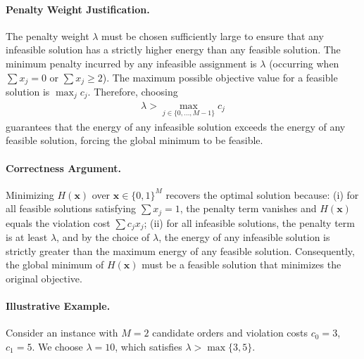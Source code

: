 \documentclass[12pt]{article}
\begin{document}
\paragraph{Penalty Weight Justification.}
The penalty weight $\lambda$ must be chosen sufficiently large to ensure that any infeasible solution has a strictly higher energy than any feasible solution. The minimum penalty incurred by any infeasible assignment is $\lambda$ (occurring when $\sum x_j = 0$ or $\sum x_j \ge 2$). The maximum possible objective value for a feasible solution is $\max_{j} c_j$. Therefore, choosing
\begin{align}
    \lambda > \max_{j \in \{0, \dots, M-1\}} c_j
\end{align}
guarantees that the energy of any infeasible solution exceeds the energy of any feasible solution, forcing the global minimum to be feasible.

\paragraph{Correctness Argument.}
Minimizing $H(\mathbf{x})$ over $\mathbf{x} \in \{0,1\}^M$ recovers the optimal solution because: (i) for all feasible solutions satisfying $\sum x_j = 1$, the penalty term vanishes and $H(\mathbf{x})$ equals the violation cost $\sum c_j x_j$; (ii) for all infeasible solutions, the penalty term is at least $\lambda$, and by the choice of $\lambda$, the energy of any infeasible solution is strictly greater than the maximum energy of any feasible solution. Consequently, the global minimum of $H(\mathbf{x})$ must be a feasible solution that minimizes the original objective.

\paragraph{Illustrative Example.}
Consider an instance with $M=2$ candidate orders and violation costs $c_0 = 3$, $c_1 = 5$. We choose $\lambda = 10$, which satisfies $\lambda > \max\{3, 5\}$.
\end{document}
